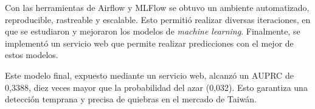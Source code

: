 Con las herramientas de Airflow y MLFlow se obtuvo un ambiente automatizado, reproducible, rastreable y escalable. Esto permitió realizar diversas iteraciones, en que se estudiaron y mejoraron los modelos de \textit{machine learning}. Finalmente, se implementó un servicio web que permite realizar predicciones con el mejor de estos modelos.

Este modelo final, expuesto mediante un servicio web, alcanzó un AUPRC de 0,3388, diez veces mayor que la probabilidad del azar (0,032). Esto garantiza una detección temprana y precisa de quiebras en el mercado de Taiwán.





